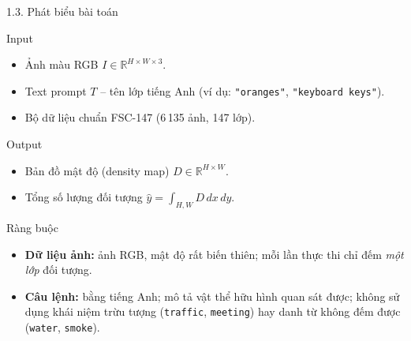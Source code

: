 \documentclass[11pt]{beamer}
\begin{document}
\begin{frame}{1.3. Phát biểu bài toán}
\scriptsize

\begin{block}{Input}
\begin{itemize}
    \item Ảnh màu RGB $I \in \mathbb{R}^{H \times W \times 3}$.
    \item Text prompt $T$ -- tên lớp tiếng Anh (ví dụ: \texttt{"oranges"}, \texttt{"keyboard keys"}).
    \item Bộ dữ liệu chuẩn FSC-147 (6\,135 ảnh, 147 lớp).
\end{itemize}
\end{block}

\begin{block}{Output}
\begin{itemize}
    \item Bản đồ mật độ (density map) $D \in \mathbb{R}^{H \times W}$.
    \item Tổng số lượng đối tượng $\hat{y} = \int_{H,W} D \, dx\, dy$.
\end{itemize}
\end{block}

\begin{block}{Ràng buộc}
\begin{itemize}
    \item \textbf{Dữ liệu ảnh:} ảnh RGB, mật độ rất biến thiên; mỗi lần thực thi chỉ đếm \emph{một lớp} đối tượng.
    \item \textbf{Câu lệnh:} bằng tiếng Anh; mô tả vật thể hữu hình quan sát được; không sử dụng khái niệm trừu tượng (\texttt{traffic}, \texttt{meeting}) hay danh từ không đếm được (\texttt{water}, \texttt{smoke}).
\end{itemize}
\end{block}

\vspace{0.3em}
\centering
{}
\end{frame}
\end{document}
